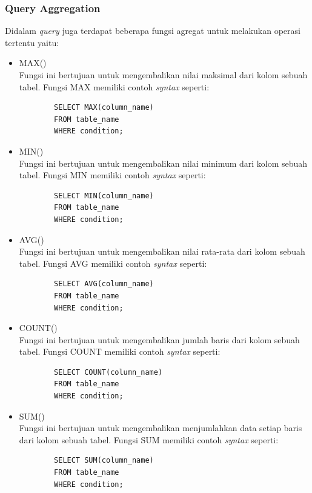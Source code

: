 \subsubsection{Query Aggregation}
Didalam \textit{query} juga terdapat beberapa fungsi agregat untuk melakukan operasi tertentu yaitu:
\begin{itemize}
    \item MAX()\\
    Fungsi ini bertujuan untuk mengembalikan nilai maksimal dari kolom sebuah tabel. Fungsi MAX memiliki contoh \textit{syntax} seperti:
    \begin{verbatim}
        SELECT MAX(column_name)
        FROM table_name
        WHERE condition;
    \end{verbatim}
    
    \item MIN()\\
    Fungsi ini bertujuan untuk mengembalikan nilai minimum dari kolom sebuah tabel. Fungsi MIN memiliki contoh \textit{syntax} seperti:
    \begin{verbatim}
        SELECT MIN(column_name)
        FROM table_name
        WHERE condition;
    \end{verbatim}
    
    \item AVG()\\
    Fungsi ini bertujuan untuk mengembalikan nilai rata-rata dari kolom sebuah tabel. Fungsi AVG memiliki contoh \textit{syntax} seperti:
    \begin{verbatim}
        SELECT AVG(column_name)
        FROM table_name
        WHERE condition;
    \end{verbatim}  
    
    \item COUNT()\\
     Fungsi ini bertujuan untuk mengembalikan jumlah baris dari kolom sebuah tabel. Fungsi COUNT memiliki contoh \textit{syntax} seperti:
    \begin{verbatim}
        SELECT COUNT(column_name)
        FROM table_name
        WHERE condition;
    \end{verbatim} 
    
    \item SUM()\\
     Fungsi ini bertujuan untuk mengembalikan menjumlahkan data setiap baris dari kolom sebuah tabel. Fungsi SUM memiliki contoh \textit{syntax} seperti:
    \begin{verbatim}
        SELECT SUM(column_name)
        FROM table_name
        WHERE condition;
    \end{verbatim} 


\end{itemize}
